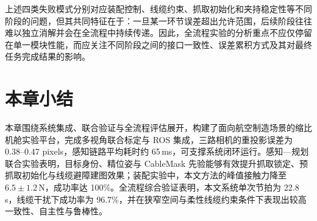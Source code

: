 上述四类失败模式分别对应装配控制、线缆约束、抓取初始化和夹持稳定性等不同阶段的问题，但其共同特征在于：一旦某一环节误差超出允许范围，后续阶段往往难以独立消解并会在全流程中持续传递。因此，全流程实验的分析重点不应仅停留在单一模块性能，而应关注不同阶段之间的接口一致性、误差累积方式及其对最终任务完成结果的影响。

\section{本章小结}
本章围绕系统集成、联合验证与全流程评估展开，构建了面向航空制造场景的缩比机舱实验平台，完成多视角联合标定与 ROS 集成，三路相机的重投影误差为 0.38--0.47 pixels，感知链路平均耗时约 65\,ms，可支撑系统闭环运行。感知---规划联合实验表明，目标身份、精位姿与 CableMask 先验能够有效提升抓取锁定、预抓取初始化与线缆避障建图效果；装配实验中，本文方法的峰值接触力降至 $6.5\pm1.2$\,N，成功率达 100\%。全流程综合验证表明，本文系统单次节拍为 22.8\,s，线缆干扰下成功率为 96.7\%，并在狭窄空间与柔性线缆约束条件下表现出较高一致性、自主性与鲁棒性。

